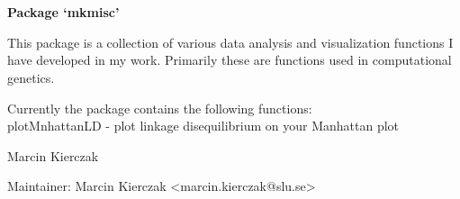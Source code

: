 \documentclass[a4paper]{book}
\begin{document}
\chapter*{}
\begin{center}
{\textbf{\huge Package `mkmisc'}}
\par\bigskip{\large \today}
\end{center}
\begin{description}
\raggedright{}
\item[Type]
\item[Title]
\item[Version]
\item[Date]
\item[Author]
\item[Maintainer]\AsIs{}
\item[Description]
\item[License]
\end{description}
%
\begin{Description}\relax
This package is a collection of various data analysis and visualization functions I have developed in my work. Primarily these are functions used in computational genetics.
\end{Description}
%
\begin{Details}\relax

Currently the package contains the following functions:\\{}
plotMnhattanLD - plot linkage disequilibrium on your Manhattan plot
\end{Details}
%
\begin{Author}\relax
Marcin Kierczak

Maintainer: Marcin Kierczak <marcin.kierczak@slu.se>
\end{Author}
\end{document}
